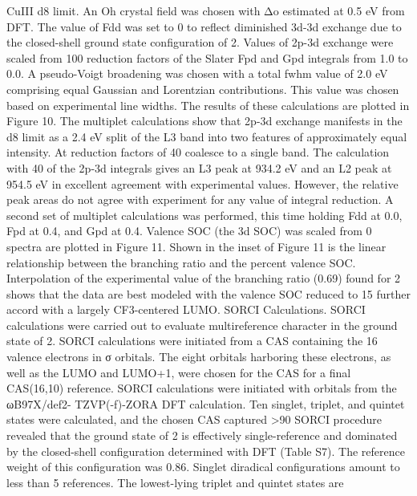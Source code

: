 CuIII d8 limit. An Oh crystal ﬁeld was chosen with Δo estimated
at 0.5 eV from DFT. The value of Fdd was set to 0 to reﬂect
diminished 3d-3d exchange due to the closed-shell ground state
conﬁguration of 2. Values of 2p-3d exchange were scaled from
100%
reduction factors of the Slater Fpd and Gpd integrals from 1.0 to
0.0. A pseudo-Voigt broadening was chosen with a total fwhm
value of 2.0 eV comprising equal Gaussian and Lorentzian
contributions. This value was chosen based on experimental
line widths. The results of these calculations are plotted in
Figure 10.
The multiplet calculations show that 2p-3d exchange
manifests in the d8 limit as a 2.4 eV split of the L3 band into
two features of approximately equal intensity. At reduction
factors of 40%
coalesce to a single band. The calculation with 40%
of the 2p-3d integrals gives an L3 peak at 934.2 eV and an L2
peak at 954.5 eV in excellent agreement with experimental
values. However, the relative peak areas do not agree with
experiment for any value of integral reduction.
A second set of multiplet calculations was performed, this
time holding Fdd at 0.0, Fpd at 0.4, and Gpd at 0.4. Valence SOC
(the 3d SOC) was scaled from 0%
spectra are plotted in Figure 11. Shown in the inset of Figure 11
is the linear relationship between the branching ratio and the
percent valence SOC. Interpolation of the experimental value
of the branching ratio (0.69) found for 2 shows that the data
are best modeled with the valence SOC reduced to 15%
further accord with a largely CF3-centered LUMO.
SORCI Calculations. SORCI calculations were carried out
to evaluate multireference character in the ground state of 2.
SORCI calculations were initiated from a CAS containing the
16 valence electrons in σ orbitals. The eight orbitals harboring
these electrons, as well as the LUMO and LUMO+1, were
chosen for the CAS for a ﬁnal CAS(16,10) reference. SORCI
calculations were initiated with orbitals from the ωB97X/def2-
TZVP(-f)-ZORA DFT calculation. Ten singlet, triplet, and
quintet states were calculated, and the chosen CAS captured
>90%
SORCI procedure revealed that the ground state of 2 is
eﬀectively single-reference and dominated by the closed-shell
conﬁguration determined with DFT (Table S7). The reference
weight of this conﬁguration was 0.86. Singlet diradical
conﬁgurations amount to less than 5%
references. The lowest-lying triplet and quintet states are
